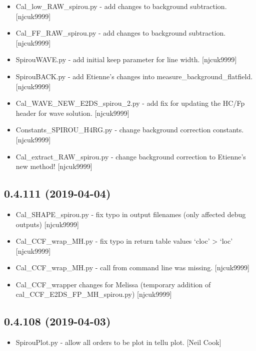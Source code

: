 \documentclass[a4paper,10pt,english]{report}
\begin{document}
\begin{itemize}
\item {} 
Cal\_low\_RAW\_spirou.py - add changes to background subtraction.
{[}njcuk9999{]}

\item {} 
Cal\_FF\_RAW\_spirou.py - add changes to background subtraction.
{[}njcuk9999{]}

\item {} 
SpirouWAVE.py - add initial keep parameter for line width. {[}njcuk9999{]}

\item {} 
SpirouBACK.py - add Etienne’s changes into
measure\_background\_flatfield. {[}njcuk9999{]}

\item {} 
Cal\_WAVE\_NEW\_E2DS\_spirou\_2.py - add fix for updating the HC/Fp header
for wave solution. {[}njcuk9999{]}

\item {} 
Constants\_SPIROU\_H4RG.py - change background correction constants.
{[}njcuk9999{]}

\item {} 
Cal\_extract\_RAW\_spirou.py - change background correction to Etienne’s
new method! {[}njcuk9999{]}

\end{itemize}


\subsection{0.4.111 (2019-04-04)}
\label{\detokenize{misc/changelog:id148}}\begin{itemize}
\item {} 
Cal\_SHAPE\_spirou.py - fix typo in output filenames (only affected
debug outputs) {[}njcuk9999{]}

\item {} 
Cal\_CCF\_wrap\_MH.py - fix typo in return table values ‘cloc’ \textendash{}\textgreater{} ‘loc’
{[}njcuk9999{]}

\item {} 
Cal\_CCF\_wrap\_MH.py - call from command line was missing. {[}njcuk9999{]}

\item {} 
Cal\_CCF\_wrapper changes for Melissa (temporary addition of
cal\_CCF\_E2DS\_FP\_MH\_spirou.py) {[}njcuk9999{]}

\end{itemize}


\subsection{0.4.108 (2019-04-03)}
\label{\detokenize{misc/changelog:id149}}\begin{itemize}
\item {} 
SpirouPlot.py - allow all orders to be plot in tellu plot. {[}Neil Cook{]}

\end{itemize}
\end{document}
